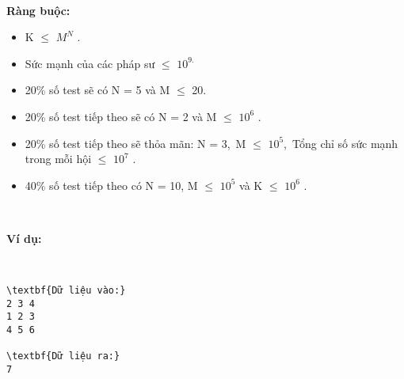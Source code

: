  

\textbf{Ràng buộc: }
\begin{itemize}
	\item K  $\le$  $M^{N}$ .
	\item Sức mạnh của các pháp sư  $\le$  $10^{9.}$
	\item 

20\% số test sẽ có N = 5 và M  $\le$  20.
	\item 

20\% số test tiếp theo sẽ có N = 2 và M  $\le$  $10^{6}$ .
	\item 

20\% số test tiếp theo sẽ thỏa mãn: N = 3, M  $\le$  $10^{5}$, Tổng chỉ số sức mạnh trong mỗi hội  $\le$  $10^{7}$ .
	\item 

40\% số test tiếp theo có N = 10, M  $\le$  $10^{5}$ và K  $\le$  $10^{6}$ .
\end{itemize}

 

\textbf{Ví dụ: }

 
\begin{verbatim}
\textbf{Dữ liệu vào:}
2 3 4
1 2 3
4 5 6

\textbf{Dữ liệu ra:}
7\end{verbatim}

